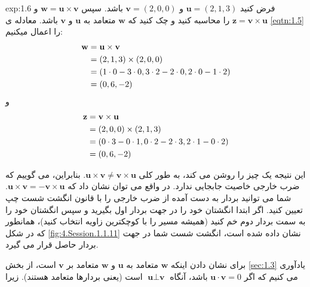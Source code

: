 {\begin{spacing}{1.5}
        \begin{example}{exp:1.6}
            فرض کنید $\textbf{u}=(2,1,3)$ و $\textbf{v}=(2,0,0)$ باشد. سپس $\textbf{w}=\textbf{u}\times\textbf{v}$ و $\textbf{z}=\textbf{v}\times\textbf{u}$ را محاسبه کنید و چک کنید که $\textbf{w}$ متعامد به $\textbf{u}$ و $\textbf{v}$ باشد. معادله ی \ref{eqtn:1.5} را اعمال میکنیم: \\
            \begin{equation*}
                \centering
                \begin{split}
                    \textbf{w}&=\textbf{u}\times\textbf{v}\\
                    &=(2,1,3)\times(2,0,0)\\
                    &=(1\cdot 0-3\cdot 0, 3\cdot 2-2\cdot 0, 2\cdot 0-1\cdot 2)\\
                    &=(0,6,-2)
                \end{split}
            \end{equation*}
            و
            \begin{equation*}
                \centering
                \begin{split}
                    \textbf{z}&=\textbf{v}\times\textbf{u}\\
                    &=(2,0,0)\times(2,1,3)\\
                    &=(0\cdot 3-0\cdot 1, 0\cdot 2-2\cdot 3, 2\cdot 1-0\cdot 2)\\
                    &=(0,6,-2)
                \end{split}
            \end{equation*}

            این نتیجه یک چیز را روشن می کند، به طور کلی $\textbf{u}\times\textbf{v}\neq\textbf{v}\times\textbf{u}$. بنابراین، می گوییم که ضرب خارجی خاصیت جابجایی ندارد.
            در واقع می توان نشان داد که $\textbf{u}\times\textbf{v}=-\textbf{v}\times\textbf{u}$. شما می توانید بردار به دست آمده از ضرب خارجی را با قانون انگشت شست چپ تعیین کنید.
            اگر ابتدا انگشتان خود را در جهت بردار اول بگیرید و سپس انگشتان خود را به سمت بردار دوم خم کنید (همیشه مسیر را با کوچکترین زاویه انتخاب کنید)، همانطور که در شکل \ref{fig:4.Session.1.1.11} نشان داده شده است، انگشت شست شما در جهت بردار حاصل قرار می گیرد.

            برای نشان دادن اینکه $\textbf{w}$ متعامد به $\textbf{u}$ و $\textbf{w}$ متعامد بر $\textbf{v}$ است،
            از بخش \ref{sec:1.3} یادآوری می کنیم که اگر $\textbf{u}\cdot\textbf{v}=0$ باشد،
            آنگاه $\textbf{u}\perp\textbf{v}$ است (یعنی بردارها متعامد هستند). زیرا


\end{example}
\end{spacing}}
